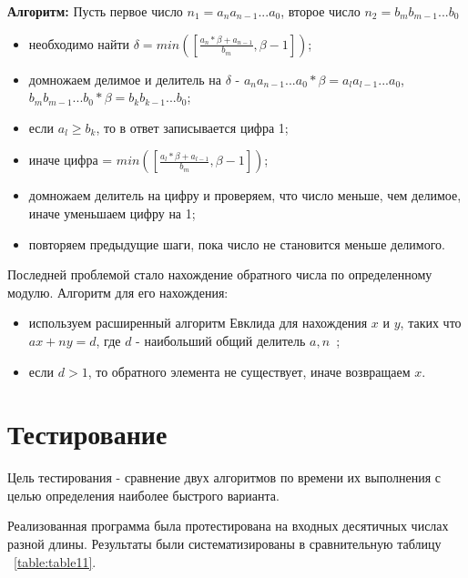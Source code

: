 \documentclass[14pt, russian]{scrartcl}
\begin{document}
\textbf{Алгоритм:} Пусть первое число $n_{1}=a_{n}a_{n-1}...a_{0}$, второе число $n_{2}=b_{m}b_{m-1}...b_{0}$
\begin{itemize}
    \item необходимо найти $\delta=min([\frac{a_{n}*\beta+a_{n-1}}{b_{m}},\beta-1])$;
    \item домножаем делимое и делитель на $\delta$ - $a_{n}a_{n-1}...a_{0}*\beta=a_{l}a_{l-1}...a_{0}$, $b_{m}b_{m-1}...b_{0}*\beta=b_{k}b_{k-1}...b_{0}$;
    \item если $a_{l}\geq b_{k}$, то в ответ записывается цифра 1;
    \item иначе цифра = $ min([\frac{a_{l}*\beta+a_{l-1}}{b_{m}},\beta-1])$;
    \item домножаем делитель на цифру и проверяем, что число меньше, чем делимое, иначе уменьшаем цифру на 1;
    \item повторяем предыдущие шаги, пока число не становится меньше делимого.
\end{itemize}

Последней проблемой стало нахождение обратного числа по определенному модулю.
Алгоритм для его нахождения:
\begin{itemize}
    \item используем расширенный алгоритм Евклида для нахождения $x$ и $y$, таких что $ax+ny=d$, где $d$ - наибольший общий делитель $a,n$~\cite{Euclid};
    \item если $d>1$, то обратного элемента не существует, иначе возвращаем $x$.
\end{itemize}

\section{Тестирование}
Цель тестирования - сравнение двух алгоритмов по времени их выполнения с целью определения наиболее быстрого варианта. 

Реализованная программа была протестирована на входных десятичных числах разной длины. Результаты были систематизированы в сравнительную таблицу ~\ref{table:table11}.
\end{document}
